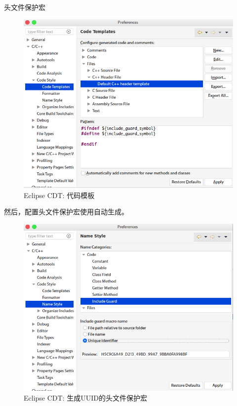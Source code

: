 \begin{content}
\begin{episode}{头文件保护宏}
\begin{content}
\begin{figure}[H]
\centering
\includegraphics[width=1.0\textwidth]{figures/xunit/eclipse-code-template.png}
\caption{Eclipse CDT: 代码模板}
 \label{fig:eclipse-code-template}
\end{figure}

然后，配置头文件保护宏使用自动生成。

\begin{figure}[H]
\centering
\includegraphics[width=1.0\textwidth]{figures/xunit/eclipse-include-guard.png}
\caption{Eclipse CDT: 生成UUID的头文件保护宏}
 \label{fig:eclipse-include-guard}
\end{figure}


\end{content}
\end{episode}
\end{content}
